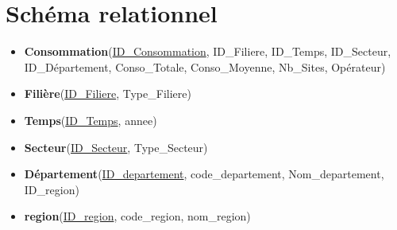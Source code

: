 \documentclass{article}
\begin{document}
\vspace{2cm}

\section*{Schéma relationnel}

\begin{itemize}
    \item \textbf{Consommation}(\underline{ID\_Consommation}, ID\_Filiere, ID\_Temps, ID\_Secteur, ID\_Département, Conso\_Totale, Conso\_Moyenne, Nb\_Sites, Opérateur)
    
    \item \textbf{Filière}(\underline{ID\_Filiere}, Type\_Filiere)
    
    \item \textbf{Temps}(\underline{ID\_Temps}, annee)
    
    \item \textbf{Secteur}(\underline{ID\_Secteur}, Type\_Secteur)
    
    \item \textbf{Département}(\underline{ID\_departement},  code\_departement, Nom\_departement, ID\_region)
    
    \item \textbf{region}(\underline{ID\_region}, code\_region, nom\_region)
\end{itemize}
\end{document}
